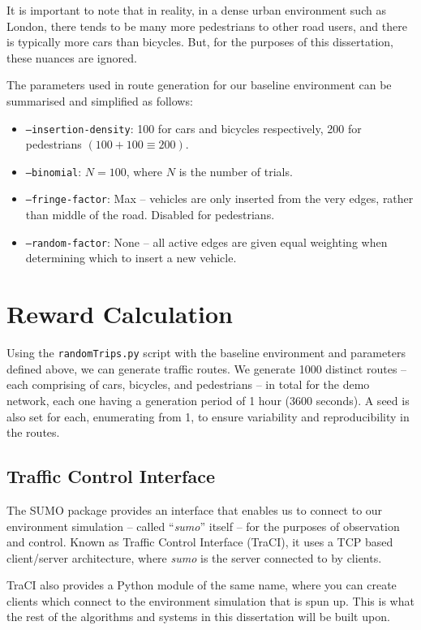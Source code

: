 \documentclass[a4paper]{report}
\begin{document}
It is important to note that in reality, in a dense urban environment such as London, there tends to be many more pedestrians to other road users, and there is typically more cars than bicycles. But, for the purposes of this dissertation, these nuances are ignored.

The parameters used in route generation for our baseline environment can be summarised and simplified as follows:
\begin{itemize}
    \item \texttt{--insertion-density}: 100 for cars and bicycles respectively, 200 for pedestrians $(100+100\equiv200)$.
    \item \texttt{--binomial}: $N=100$, where $N$ is the number of trials.
    \item \texttt{--fringe-factor}: Max -- vehicles are only inserted from the very edges, rather than middle of the road. Disabled for pedestrians.
    \item \texttt{--random-factor}: None -- all active edges are given equal weighting when determining which to insert a new vehicle.
\end{itemize}

\section{Reward Calculation}

Using the \texttt{randomTrips.py} script with the baseline environment and parameters defined above, we can generate traffic routes. We generate 1000 distinct routes -- each comprising of cars, bicycles, and pedestrians -- in total for the demo network, each one having a generation period of 1 hour (3600 seconds). A seed is also set for each, enumerating from 1, to ensure variability and reproducibility in the routes.

\subsection{Traffic Control Interface}

The SUMO package provides an interface that enables us to connect to our environment simulation -- called ``\emph{sumo}'' itself -- for the purposes of observation and control. Known as Traffic Control Interface (TraCI), it uses a TCP based client/server architecture, where \emph{sumo} is the server connected to by clients.

TraCI also provides a Python module of the same name, where you can create clients which connect to the environment simulation that is spun up. This is what the rest of the algorithms and systems in this dissertation will be built upon.
\end{document}
